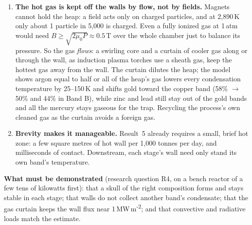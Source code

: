 \documentclass[11pt,a4paper]{article}
\begin{document}
\begin{enumerate}
\item \textbf{The hot gas is kept off the walls by flow, not by fields.} Magnets cannot hold the heap: a field acts only on charged particles, and at 2,890\,K only about 1 particle in 5,000 is charged. Even a fully ionized gas at 1\,atm would need $B \ge \sqrt{2\mu_0 P} \approx 0.5$\,T over the whole chamber just to balance its pressure. So the gas \emph{flows}: a swirling core and a curtain of cooler gas along or through the wall, as induction plasma torches use a sheath gas, keep the hottest gas away from the wall. The curtain dilutes the heap; the model shows argon equal to half or all of the heap's gas lowers every condensation temperature by 25--150\,K and shifts gold toward the copper band (58\% $\to$ 50\% and 44\% in Band B), while zinc and lead still stay out of the gold bands and all the mercury stays gaseous for the trap. Recycling the process's own cleaned gas as the curtain avoids a foreign gas.
\item \textbf{Brevity makes it manageable.} Result~5 already requires a small, brief hot zone: a few square metres of hot wall per 1,000 tonnes per day, and milliseconds of contact. Downstream, each stage's wall need only stand its own band's temperature.
\end{enumerate}
\textbf{What must be demonstrated} (research question R4, on a bench reactor of a few tens of kilowatts first): that a skull of the right composition forms and stays stable in each stage; that walls do not collect another band's condensate; that the gas curtain keeps the wall flux near 1\,MW\,m\textsuperscript{-2}; and that convective and radiative loads match the estimate.

\end{document}
